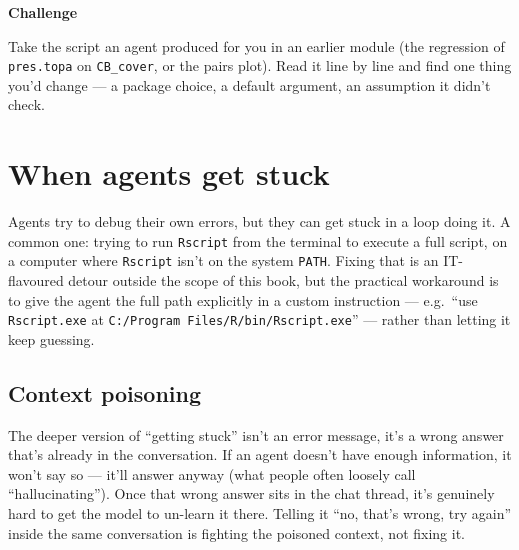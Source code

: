 \documentclass[
  letterpaper,
  DIV=11,
  numbers=noendperiod]{scrreprt}
\begin{document}
\begin{tcolorbox}[enhanced jigsaw, toprule=.15mm, rightrule=.15mm, left=2mm, leftrule=.75mm, breakable, opacityback=0, arc=.35mm, colframe=quarto-callout-important-color-frame, bottomrule=.15mm, colback=white]
\begin{minipage}[t]{5.5mm}
\textcolor{quarto-callout-important-color}{\faExclamation}
\end{minipage}%
\begin{minipage}[t]{\textwidth - 5.5mm}

\vspace{-3mm}\textbf{Challenge}\vspace{3mm}

Take the script an agent produced for you in an earlier module (the
regression of \texttt{pres.topa} on \texttt{CB\_cover}, or the pairs
plot). Read it line by line and find one thing you'd change --- a
package choice, a default argument, an assumption it didn't check.

\end{minipage}%
\end{tcolorbox}

\chapter{When agents get stuck}\label{when-agents-get-stuck}

Agents try to debug their own errors, but they can get stuck in a loop
doing it. A common one: trying to run \texttt{Rscript} from the terminal
to execute a full script, on a computer where \texttt{Rscript} isn't on
the system \texttt{PATH}. Fixing that is an IT-flavoured detour outside
the scope of this book, but the practical workaround is to give the
agent the full path explicitly in a custom instruction --- e.g.~``use
\texttt{Rscript.exe} at \texttt{C:/Program\ Files/R/bin/Rscript.exe}''
--- rather than letting it keep guessing.

\section{Context poisoning}\label{context-poisoning}

The deeper version of ``getting stuck'' isn't an error message, it's a
wrong answer that's already in the conversation. If an agent doesn't
have enough information, it won't say so --- it'll answer anyway (what
people often loosely call ``hallucinating''). Once that wrong answer
sits in the chat thread, it's genuinely hard to get the model to
un-learn it there. Telling it ``no, that's wrong, try again'' inside the
same conversation is fighting the poisoned context, not fixing it.
\end{document}
